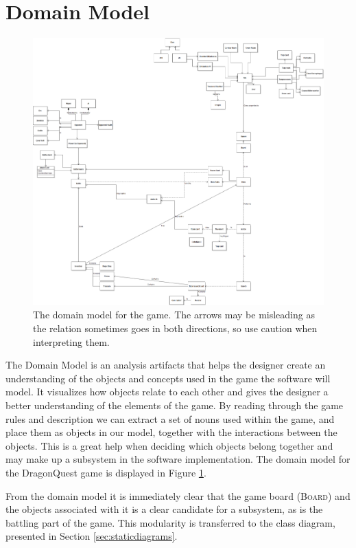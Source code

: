 \section{Domain Model}
\label{sec:domainmodel}

\begin{figure}[h]
\center
\includegraphics[width=\textwidth]{diagrams/DomainModel.png}
\caption{The domain model for the game. The arrows may be misleading as the relation sometimes goes in both directions, so use caution when interpreting them.}
\label{fig:domain_model}
\end{figure}

The Domain Model is an analysis artifacts that helps the designer create an understanding of the objects and concepts used in the game the software will model. It visualizes how objects relate to each other and gives the designer a better understanding of the elements of the game. By reading through the game rules and description we can extract a set of nouns used within the game, and place them as objects in our model, together with the interactions between the objects. This is a great help when deciding which objects belong together and may make up a subsystem in the software implementation. The domain model for the DragonQuest game is displayed in Figure \ref{fig:domain_model}.

From the domain model it is immediately clear that the game board (\textsc{Board}) and the objects associated with it is a clear candidate for a subsystem, as is the battling part of the game. This modularity is transferred to the class diagram, presented in Section \ref{sec:staticdiagrams}.

